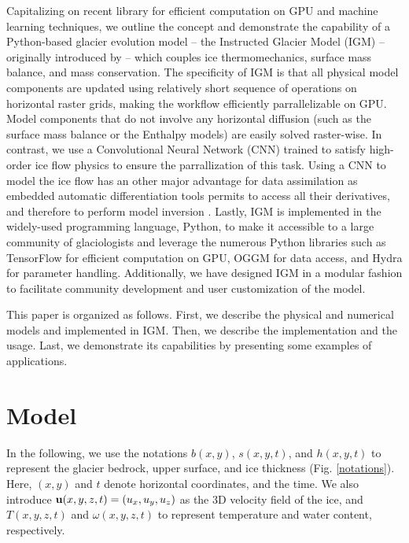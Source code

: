 \documentclass[gmd]{copernicus}
\begin{document}
Capitalizing on recent library for efficient computation on GPU and machine learning techniques, we outline the concept and demonstrate the capability of a Python-based glacier evolution model -- the Instructed Glacier Model (IGM) -- originally introduced by \citet{jouvet2022deep} -- which couples ice thermomechanics, surface mass balance, and mass conservation. The specificity of IGM is that all physical model components are updated using relatively short sequence of operations on horizontal raster grids, making the workflow efficiently parrallelizable on GPU. Model components that do not involve any horizontal diffusion (such as the surface mass balance or the Enthalpy models) are easily solved raster-wise. In contrast, we use a Convolutional Neural Network (CNN) trained to satisfy high-order ice flow physics \citep{jouvet2023ice} to ensure the parrallization of this task. Using a CNN to model the ice flow has an other major advantage for data assimilation as embedded automatic differentiation tools permits to access all their derivatives, and therefore to perform model inversion \citep{jouvet2023inversion}. Lastly, IGM is implemented in the widely-used programming language, Python, to make it accessible to a large community of glaciologists and leverage the numerous Python libraries such as TensorFlow for efficient computation on GPU, OGGM for data access, and Hydra for parameter handling. Additionally, we have designed IGM in a modular fashion to facilitate community development and user customization of the model.

This paper is organized as follows. First, we describe the physical and numerical models and implemented in IGM. Then, we describe the implementation and the usage.
Last, we demonstrate its capabilities by presenting some examples of applications.
  
\section{Model}   

In the following, we use the notations $b(x,y)$, $s(x,y,t)$, and $h(x,y,t)$ to represent the glacier bedrock, upper surface, and ice thickness (Fig. \ref{notations}). Here, $(x,y)$ and $t$ denote horizontal coordinates, and the time. We also introduce ${\bf u}(x,y,z,t) = (u_x,u_y,u_z)$ as the 3D velocity field of the ice, and $T(x, y, z, t)$ and $\omega(x,y,z,t)$ to represent temperature and water content, respectively. 
\end{document}
